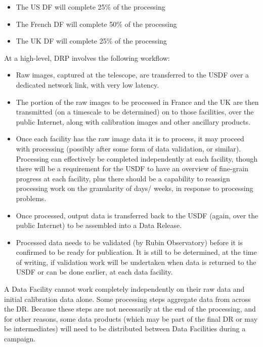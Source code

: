 \begin{itemize}

\item The US DF will complete 25\% of the processing

\item The French DF will complete 50\% of the processing

\item The UK DF will complete 25\% of the processing

\end{itemize}

At a high-level, DRP involves the following workflow:

\begin{itemize}

  \item Raw images, captured at the telescope, are transferred to the USDF over a dedicated network link, with very low latency.

  \item The portion of the raw images to be processed in France and the UK are then transmitted (on a timescale to be determined) on to those facilities, over the public Internet, along with calibration images and other ancillary products.

  \item Once each facility has the raw image data it is to process, it may proceed with processing (possibly after some form of data validation, or similar). Processing can effectively be completed independently at each facility, though there will be a requirement for the USDF to have an overview of fine-grain progress at each facility, plus there should be a capability to reassign processing work on the granularity of days/ weeks, in response to processing problems.

  \item Once processed, output data is transferred back to the USDF (again, over the public Internet) to be assembled into a Data Release.

  \item Processed data needs to be validated (by Rubin Observatory) before it is confirmed to be ready for publication. It is still to be determined, at the time of writing, if validation work will be undertaken when data is returned to the USDF or can be done earlier, at each data facility.
    
\end{itemize}

A Data Facility cannot work completely independently on their raw data and initial calibration data alone. Some processing steps aggregate data from across the DR. Because these steps are not necessarily at the end of the processing, and for other reasons, some data products (which may be part of the final DR or may be intermediates) will need to be distributed between Data Facilities during a campaign.


